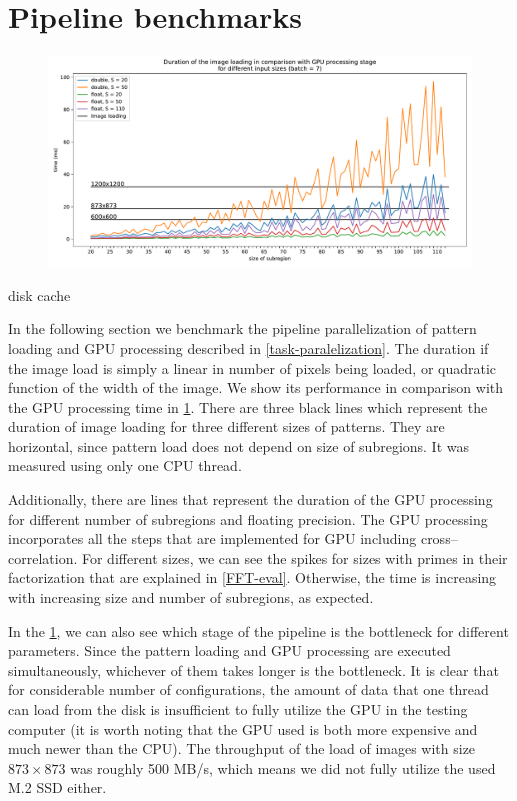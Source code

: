 \section{Pipeline benchmarks}

\begin{figure}
	\centering
	\includegraphics[width=\textwidth]{img/eval/load-plot}
	\caption{}
	\label{load-plot}
\end{figure}

disk cache

In the following section we benchmark the pipeline parallelization of pattern loading and GPU processing described in \cref{task-paralelization}. The duration if the image load is simply a linear in number of pixels being loaded, or quadratic function of the width of the image. We show its performance in comparison with the GPU processing time in \cref{load-plot}. There are three black lines which represent the duration of image loading for three different sizes of patterns. They are horizontal, since pattern load does not depend on size of subregions. It was measured using only one CPU thread.

Additionally, there are lines that represent the duration of the GPU processing for different number of subregions and floating precision. The GPU processing incorporates all the steps that are implemented for GPU including cross--correlation. For different sizes, we can see the spikes for sizes with primes in their factorization that are explained in \cref{FFT-eval}. Otherwise, the time is increasing with increasing size and number of subregions, as expected.

In the \cref{load-plot}, we can also see which stage of the pipeline is the bottleneck for different parameters. Since the pattern loading and GPU processing are executed simultaneously, whichever of them takes longer is the bottleneck. It is clear that for considerable number of configurations, the amount of data that one thread can load from the disk is insufficient to fully utilize the GPU in the testing computer (it is worth noting that the GPU used is both more expensive and much newer than the CPU). The throughput of the load of images with size $873\times873$ was roughly 500 MB/s, which means we did not fully utilize the used M.2 SSD either.

